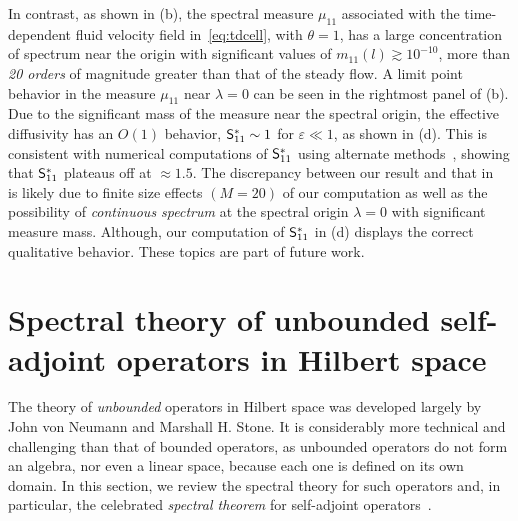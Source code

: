 \documentclass[amsa]{ipart}
\begin{document}
In contrast, as shown in (b),
the spectral measure $\mu_{11}$ associated with the time-dependent fluid
velocity field in~\eqref{eq:tdcell}, with $\theta=1$, has a large
concentration of spectrum near the origin with significant values of
$m_{11}(l)\gtrsim10^{-10}$, more than \emph{20 orders} of magnitude greater than
that of the steady flow. A limit point behavior in the measure
$\mu_{11}$ near $\lambda=0$ can be seen in the rightmost panel of
(b). Due to the significant 
mass of the measure near the spectral origin, the effective
diffusivity has an $O(1)$ behavior, $\mathsf{S}^*_{11}\sim1$ for $\varepsilon\ll1$, as shown
in (d). This is consistent with
numerical computations of $\mathsf{S}^*_{11}$ using alternate 
methods~\cite{Biferale:PF:2725}, showing that $\mathsf{S}^*_{11}$ plateaus
off at $\approx1.5$. The discrepancy between our result and that in
~\cite{Biferale:PF:2725} is likely due to finite size effects $(M=20)$
of our computation as well as the possibility of \emph{continuous
  spectrum} at the spectral origin $\lambda=0$ with significant measure
mass. Although, our computation of $\mathsf{S}^*_{11}$ in
(d) displays the correct
qualitative behavior. These topics are part of future work.





\appendix
%

\section{Spectral theory of unbounded self-adjoint operators in
  Hilbert space} \label{sec:Spectral_Theory}    
%
The theory of \emph{unbounded} operators in Hilbert
space was developed largely by John von Neumann and Marshall H. Stone. It
is considerably more technical and challenging than that of bounded
operators, as unbounded operators do not form an algebra, nor even a
linear space, because each one is defined on its own domain. In this
section, we review the spectral theory for such operators and, in
particular, the celebrated \emph{spectral theorem} for self-adjoint
operators~\cite{Reed-1980,Stone:64}.
\end{document}
